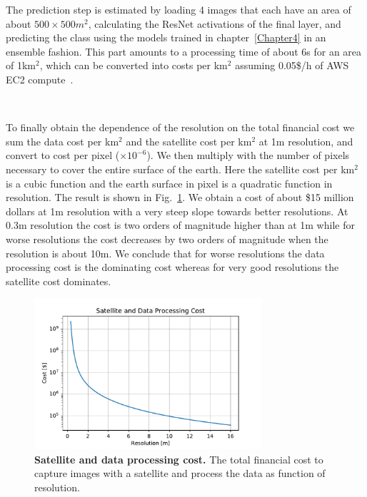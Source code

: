 The prediction step is estimated by loading 4 images that each have an area of about $500\times500m^2$, calculating the ResNet activations of the final layer, and predicting the class using the models trained in chapter~\ref{Chapter4} in an ensemble fashion. This part amounts to a processing time of about 6s for an area of 1km$^2$, which can be converted into costs per km$^2$ assuming 0.05\$/h of AWS EC2 compute~\parencite{aws}.

\

To finally obtain the dependence of the resolution on the total financial cost we sum the data cost per km$^2$ and the satellite cost per km$^2$ at 1m resolution, and convert to cost per pixel ($\times 10^{-6}$). We then multiply with the number of pixels necessary to cover the entire surface of the earth. Here the satellite cost per km$^2$ is a cubic function and the earth surface in pixel is a quadratic function in resolution. The result is shown in Fig.~\ref{fig:costs}. We obtain a cost of about \$15 million dollars at 1m resolution with a very steep slope towards better resolutions. At 0.3m resolution the cost is two orders of magnitude higher than at 1m while for worse resolutions the cost decreases by two orders of magnitude when the resolution is about 10m. We conclude that for worse resolutions the data processing cost is the dominating cost whereas for very good resolutions the satellite cost dominates.

\begin{figure}[h!]
	\centering
	\includegraphics[width=0.75\textwidth]{Figures/costs.pdf}
	\captionsetup{width=1\linewidth}
	\caption{\textbf{Satellite and data processing cost.} The total financial cost to capture images with a satellite and process the data as function of resolution.}
	\label{fig:costs}
\end{figure}


